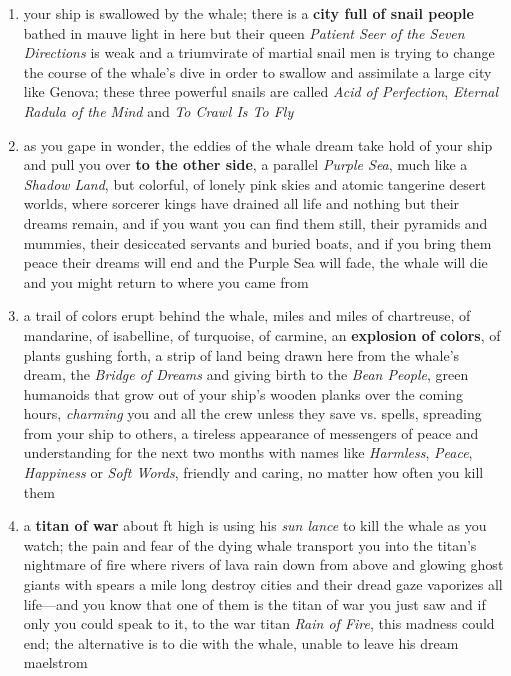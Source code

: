 \documentclass[11pt]{bxart}
\begin{document}
\begin{enumerate}
\item your ship is swallowed by the whale; there is a \textbf{city
  full of snail people} bathed in mauve light in here but their queen
  \textit{Patient Seer of the Seven Directions} is weak and a
  triumvirate of martial snail men is trying to change the course of
  the whale's dive in order to swallow and assimilate a large city
  like Genova; these three powerful snails are called \textit{Acid of
    Perfection}, \textit{Eternal Radula of the Mind} and \textit{To
    Crawl Is To Fly}


\item as you gape in wonder, the eddies of the whale dream take hold
  of your ship and pull you over \textbf{to the other side}, a
  parallel \textit{Purple Sea}, much like a \textit{Shadow Land}, but
  colorful, of lonely pink skies and atomic tangerine desert worlds,
  where sorcerer kings have drained all life and nothing but their
  dreams remain, and if you want you can find them still, their
  pyramids and mummies, their desiccated servants and buried boats,
  and if you bring them peace their dreams will end and the Purple Sea
  will fade, the whale will die and you might return to where you came
  from

\item a trail of colors erupt behind the whale, miles and miles of
  chartreuse, of mandarine, of isabelline, of turquoise, of carmine,
  an \textbf{explosion of colors}, of plants gushing forth, a strip of
  land being drawn here from the whale's dream, the \textit{Bridge of
    Dreams} and giving birth to the \textit{Bean People}, green
  humanoids that grow out of your ship's wooden planks over the coming
  hours, \textit{charming} you and all the crew unless they save vs.
  spells, spreading from your ship to others, a tireless appearance of
  messengers of peace and understanding for the next two months with
  names like \textit{Harmless}, \textit{Peace}, \textit{Happiness} or
  \textit{Soft Words}, friendly and caring, no matter how often you
  kill them

\item a \textbf{titan of war} about \unit[200]{ft} high is using his
  \textit{sun lance} to kill the whale as you watch; the pain and fear
  of the dying whale transport you into the titan's nightmare of fire
  where rivers of lava rain down from above and glowing ghost giants
  with spears a mile long destroy cities and their dread gaze
  vaporizes all life—and you know that one of them is the titan of war
  you just saw and if only you could speak to it, to the war titan
  \textit{Rain of Fire}, this madness could end; the alternative is to
  die with the whale, unable to leave his dream maelstrom


\end{enumerate}
\end{document}
